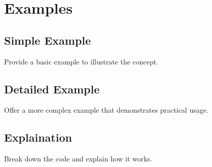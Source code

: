\section{Examples}
\subsection*{Simple Example}
Provide a basic example to illustrate the concept.
\subsection*{Detailed Example}
Offer a more complex example that demonstrates practical usage.
\subsection*{Explaination}
Break down the code and explain how it works.